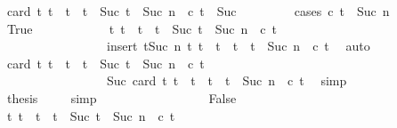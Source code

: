 \begin{isabellebody}
\ {\isacartoucheopen}card\ {\isacharbraceleft}t{\isacharprime}{\isachardot}\ t\ {\isasymle}\ t{\isacharprime}\ {\isasymand}\ t{\isacharprime}\ {\isacharless}\ Suc\ {\isacharparenleft}t\ {\isacharplus}\ Suc\ n{\isacharparenright}\ {\isasymand}\ c\ t{\isacharprime}{\isacharbraceright}\ {\isasymle}\ Suc\ {}{\isacartoucheclose}\isanewline
\ \ \ \ \ \ \isamarkupfalse%
\ {\isacharparenleft}cases\ {\isacartoucheopen}c\ {\isacharparenleft}t\ {\isacharplus}\ Suc\ n{\isacharparenright}{\isacartoucheclose}{\isacharparenright}\isanewline
\ \ \ \ \ \ \ \ \isamarkupfalse%
\ True\isanewline
\ \ \ \ \ \ \ \ \ \ \isamarkupfalse%
\ {\isacartoucheopen}{\isacharbraceleft}t{\isacharprime}{\isachardot}\ t\ {\isasymle}\ t{\isacharprime}\ {\isasymand}\ t{\isacharprime}\ {\isacharless}\ Suc\ {\isacharparenleft}t\ {\isacharplus}\ Suc\ n{\isacharparenright}\ {\isasymand}\ c\ t{\isacharprime}{\isacharbraceright}\isanewline
\ \ \ \ \ \ \ \ \ \ \ \ \ \ \ \ {\isacharequal}\ insert\ {\isacharparenleft}t{\isacharplus}Suc\ n{\isacharparenright}\ {\isacharbraceleft}t{\isacharprime}{\isachardot}\ t\ {\isasymle}\ t{\isacharprime}\ {\isasymand}\ t{\isacharprime}\ {\isacharless}\ t\ {\isacharplus}\ Suc\ n\ {\isasymand}\ c\ t{\isacharprime}{\isacharbraceright}{\isacartoucheclose}\ \isamarkupfalse%
\ auto\isanewline
\ \ \ \ \ \ \ \ \ \ \isamarkupfalse%
\ {\isacartoucheopen}card\ {\isacharbraceleft}t{\isacharprime}{\isachardot}\ t\ {\isasymle}\ t{\isacharprime}\ {\isasymand}\ t{\isacharprime}\ {\isacharless}\ Suc\ {\isacharparenleft}t\ {\isacharplus}\ Suc\ n{\isacharparenright}\ {\isasymand}\ c\ t{\isacharprime}{\isacharbraceright}\isanewline
\ \ \ \ \ \ \ \ \ \ \ \ \ \ \ \ {\isacharequal}\ Suc\ {\isacharparenleft}card\ {\isacharbraceleft}t{\isacharprime}{\isachardot}\ t\ {\isasymle}\ t{\isacharprime}\ {\isasymand}\ t{\isacharprime}\ {\isacharless}\ t\ {\isacharplus}\ Suc\ n\ {\isasymand}\ c\ t{\isacharprime}{\isacharbraceright}{\isacharparenright}{\isacartoucheclose}\ \isamarkupfalse%
\ simp\isanewline
\ \ \ \ \ \ \ \ \ \ \isamarkupfalse%
\ {\isacharquery}thesis\ \isamarkupfalse%
\ {\isacharasterisk}{\isacharasterisk}\ \isamarkupfalse%
\ simp\ \isanewline
\ \ \ \ \ \ \isamarkupfalse%
\isanewline
\ \ \ \ \ \ \ \ \isamarkupfalse%
\ False\isanewline
\ \ \ \ \ \ \ \ \ \ \isamarkupfalse%
\ {\isacartoucheopen}{\isacharbraceleft}t{\isacharprime}{\isachardot}\ t\ {\isasymle}\ t{\isacharprime}\ {\isasymand}\ t{\isacharprime}\ {\isacharless}\ Suc\ {\isacharparenleft}t\ {\isacharplus}\ Suc\ n{\isacharparenright}\ {\isasymand}\ c\ t{\isacharprime}{\isacharbraceright}\isanewline

\end{isabellebody}
